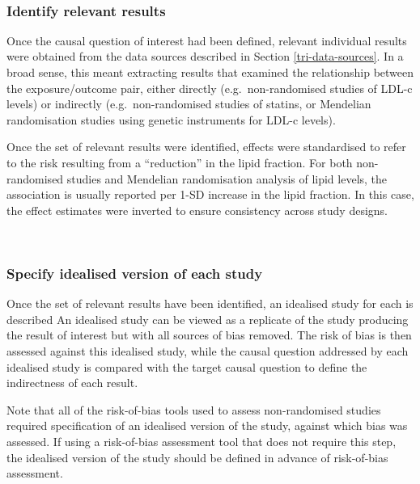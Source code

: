 \documentclass[a4paper, twoside]{templates/ociamthesis}
\begin{document}
~

\hypertarget{identify-relevant-results}{%
\subsubsection{Identify relevant results}\label{identify-relevant-results}}

Once the causal question of interest had been defined, relevant individual results were obtained from the data sources described in Section \ref{tri-data-sources}. In a broad sense, this meant extracting results that examined the relationship between the exposure/outcome pair, either directly (e.g.~non-randomised studies of LDL-c levels) or indirectly (e.g.~non-randomised studies of statins, or Mendelian randomisation studies using genetic instruments for LDL-c levels).

Once the set of relevant results were identified, effects were standardised to refer to the risk resulting from a ``reduction'' in the lipid fraction. For both non-randomised studies and Mendelian randomisation analysis of lipid levels, the association is usually reported per 1-SD increase in the lipid fraction. In this case, the effect estimates were inverted to ensure consistency across study designs.

~

\hypertarget{specify-idealised-version-of-each-study}{%
\subsubsection{Specify idealised version of each study}\label{specify-idealised-version-of-each-study}}

Once the set of relevant results have been identified, an idealised study for each is described
An idealised study can be viewed as a replicate of the study producing the result of interest but with all sources of bias removed. The risk of bias is then assessed against this idealised study, while the causal question addressed by each idealised study is compared with the target causal question to define the indirectness of each result.

Note that all of the risk-of-bias tools used to assess non-randomised studies required specification of an idealised version of the study, against which bias was assessed. If using a risk-of-bias assessment tool that does not require this step, the idealised version of the study should be defined in advance of risk-of-bias assessment.

~
\end{document}
